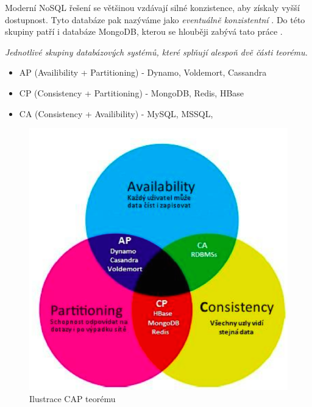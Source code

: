 Moderní NoSQL řešení se většinou vzdávají silné konzistence, aby získaly vyšší dostupnost. Tyto databáze pak nazýváme jako \emph{eventuálně konzistentní} \cite{peteraMongo}. Do této skupiny patří i databáze MongoDB, kterou se hlouběji zabývá tato práce \cite{mongoConsist}.

\vspace{0.5cm}
\noindent\emph{Jednotlivé skupiny databázových systémů, které splňují alespoň dvě části teorému.}
\begin{itemize}
\item AP (Availibility + Partitioning) - Dynamo, Voldemort, Cassandra
\item CP (Consistency + Partitioning) - MongoDB, Redis, HBase
\item CA (Consistency + Availibility) - MySQL, MSSQL, 
\end{itemize}

\begin{figure}[h]
\begin{centering}
\includegraphics[scale=0.3]{obrazky/cap}
\par\end{centering}
\caption{Ilustrace CAP teorému \cite{panykoNosql}\label{fig:cap}}
\end{figure}

